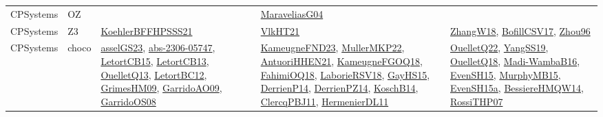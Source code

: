 {\begin{longtable}{llp{6cm}p{6cm}p{6cm}}
CPSystems & OZ &  & \href{papers/MaraveliasG04.pdf}{MaraveliasG04}\cite{MaraveliasG04} & \\
CPSystems & Z3 & \href{articles/KoehlerBFFHPSSS21.pdf}{KoehlerBFFHPSSS21}\cite{KoehlerBFFHPSSS21} & \href{articles/VlkHT21.pdf}{VlkHT21}\cite{VlkHT21} & \href{articles/ZhangW18.pdf}{ZhangW18}\cite{ZhangW18}, \href{papers/BofillCSV17.pdf}{BofillCSV17}\cite{BofillCSV17}, \href{papers/Zhou96.pdf}{Zhou96}\cite{Zhou96}\\
CPSystems & choco & \href{papers/asselGS23.pdf}{asselGS23}\cite{asselGS23}, \href{articles/abs-2306-05747.pdf}{abs-2306-05747}\cite{abs-2306-05747}, \href{articles/LetortCB15.pdf}{LetortCB15}\cite{LetortCB15}, \href{papers/LetortCB13.pdf}{LetortCB13}\cite{LetortCB13}, \href{papers/OuelletQ13.pdf}{OuelletQ13}\cite{OuelletQ13}, \href{papers/LetortBC12.pdf}{LetortBC12}\cite{LetortBC12}, \href{papers/GrimesHM09.pdf}{GrimesHM09}\cite{GrimesHM09}, \href{articles/GarridoAO09.pdf}{GarridoAO09}\cite{GarridoAO09}, \href{articles/GarridoOS08.pdf}{GarridoOS08}\cite{GarridoOS08} & \href{papers/KameugneFND23.pdf}{KameugneFND23}\cite{KameugneFND23}, \href{articles/MullerMKP22.pdf}{MullerMKP22}\cite{MullerMKP22}, \href{papers/AntuoriHHEN21.pdf}{AntuoriHHEN21}\cite{AntuoriHHEN21}, \href{papers/KameugneFGOQ18.pdf}{KameugneFGOQ18}\cite{KameugneFGOQ18}, \href{articles/FahimiOQ18.pdf}{FahimiOQ18}\cite{FahimiOQ18}, \href{articles/LaborieRSV18.pdf}{LaborieRSV18}\cite{LaborieRSV18}, \href{papers/GayHS15.pdf}{GayHS15}\cite{GayHS15}, \href{papers/DerrienP14.pdf}{DerrienP14}\cite{DerrienP14}, \href{papers/DerrienPZ14.pdf}{DerrienPZ14}\cite{DerrienPZ14}, \href{papers/KoschB14.pdf}{KoschB14}\cite{KoschB14}, \href{papers/ClercqPBJ11.pdf}{ClercqPBJ11}\cite{ClercqPBJ11}, \href{papers/HermenierDL11.pdf}{HermenierDL11}\cite{HermenierDL11} & \href{papers/OuelletQ22.pdf}{OuelletQ22}\cite{OuelletQ22}, \href{papers/YangSS19.pdf}{YangSS19}\cite{YangSS19}, \href{papers/OuelletQ18.pdf}{OuelletQ18}\cite{OuelletQ18}, \href{papers/Madi-WambaB16.pdf}{Madi-WambaB16}\cite{Madi-WambaB16}, \href{papers/EvenSH15.pdf}{EvenSH15}\cite{EvenSH15}, \href{papers/MurphyMB15.pdf}{MurphyMB15}\cite{MurphyMB15}, \href{articles/EvenSH15a.pdf}{EvenSH15a}\cite{EvenSH15a}, \href{papers/BessiereHMQW14.pdf}{BessiereHMQW14}\cite{BessiereHMQW14}, \href{papers/RossiTHP07.pdf}{RossiTHP07}\cite{RossiTHP07}\\

\end{longtable}}
